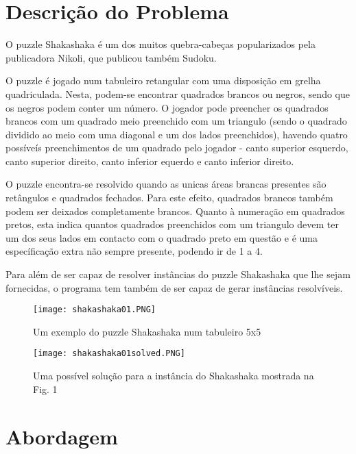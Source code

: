 \documentclass[runningheads]{llncs}
\begin{document}
\section{Descrição do Problema}
O puzzle Shakashaka é um dos muitos quebra-cabeças popularizados pela publicadora Nikoli, que publicou também Sudoku. 

O puzzle é jogado num tabuleiro retangular com uma disposição em grelha quadriculada. Nesta, podem-se encontrar quadrados brancos ou negros, sendo que os negros podem conter um número. O jogador pode preencher os quadrados brancos com um quadrado meio preenchido com um triangulo (sendo o quadrado dividido ao meio com uma diagonal e um dos lados preenchidos), havendo quatro possíveís preenchimentos de um quadrado pelo jogador - canto superior esquerdo, canto superior direito, canto inferior equerdo e canto inferior direito.

O puzzle encontra-se resolvido quando as unicas áreas brancas presentes são retângulos e quadrados fechados. Para este efeito, quadrados brancos também podem ser deixados completamente brancos.
Quanto à numeração em quadrados pretos, esta indica quantos quadrados preenchidos com um triangulo devem ter um dos seus lados em contacto com o quadrado preto em questão e é uma específicação extra não sempre presente, podendo ir de 1 a 4.

Para além de ser capaz de resolver instâncias do puzzle Shakashaka que lhe sejam fornecidas, o programa tem também de ser capaz de gerar instâncias resolvíveis.


\begin{figure}
\begin{center}
\texttt{[image: shakashaka01.PNG]}
\caption{Um exemplo do puzzle Shakashaka num tabuleiro 5x5} \label{shakashaka01}
\end{center}
\end{figure}

\begin{figure}
\begin{center}
\texttt{[image: shakashaka01solved.PNG]}
\caption{Uma possível solução para a instância do Shakashaka mostrada na Fig. 1} \label{shakashaka01solved}
\end{center}
\end{figure}


\section{Abordagem}
\end{document}
